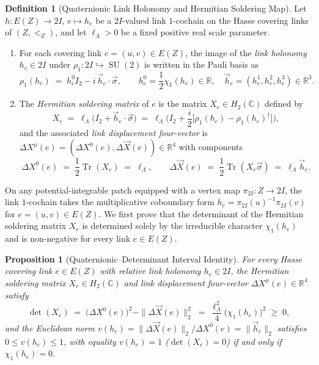 \documentclass[11pt,a4paper]{article}
\newtheorem{proposition}[theorem]{Proposition}
\theoremstyle{definition}
\newtheorem{definition}[theorem]{Definition}
\theoremstyle{remark}
\newcommand{\R}{\mathbb{R}}
\newcommand{\C}{\mathbb{C}}
\newcommand{\Tr}{\operatorname{Tr}}
\newcommand{\SU}{\operatorname{SU}}
\begin{document}
\begin{definition}[Quaternionic Link Holonomy and Hermitian Soldering Map]
\label{def:soldering_map}
Let $h : E(Z) \to 2I$, $e \mapsto h_e$ be a $2I$-valued link $1$-cochain on the Hasse covering links of $(Z, <_Z)$, and let $\ell_\Lambda > 0$ be a fixed positive real scale parameter.
\begin{enumerate}
    \item For each covering link $e = (u, v) \in E(Z)$, the image of the \emph{link holonomy} $h_e \in 2I$ under $\rho_1 : 2I \hookrightarrow \SU(2)$ is written in the Pauli basis as
    \begin{equation}
    \label{eq:pauli_decomp}
    \rho_1(h_e) \;=\; h_e^0 I_2 - i\,\vec{h}_e \cdot \vec{\sigma}, \qquad h_e^0 = \frac{1}{2}\chi_1(h_e) \in \R, \quad \vec{h}_e = (h_e^1, h_e^2, h_e^3) \in \R^3.
    \end{equation}
    \item The \emph{Hermitian soldering matrix} of $e$ is the matrix $X_e \in H_2(\C)$ defined by
    \begin{equation}
    \label{eq:hermitian_soldering_matrix}
    X_e \;=\; \ell_\Lambda\bigl(I_2 + \vec{h}_e \cdot \vec{\sigma}\bigr) \;=\; \ell_\Lambda\bigl(I_2 + \frac{i}{2}\bigl[\rho_1(h_e) - \rho_1(h_e)^\dagger\bigr]\bigr),
    \end{equation}
    and the associated \emph{link displacement four-vector} is $\Delta X^\mu(e) = (\Delta X^0(e), \Delta \vec{X}(e)) \in \R^4$ with components
    \begin{equation}
    \label{eq:link_four_vector}
    \Delta X^0(e) \;=\; \frac{1}{2}\Tr(X_e) \;=\; \ell_\Lambda, \qquad \Delta \vec{X}(e) \;=\; \frac{1}{2}\Tr(X_e \vec{\sigma}) \;=\; \ell_\Lambda \vec{h}_e.
    \end{equation}
\end{enumerate}
\end{definition}

On any potential-integrable patch equipped with a vertex map $\pi_{2I} : Z \to 2I$, the link $1$-cochain takes the multiplicative coboundary form $h_e = \pi_{2I}(u)^{-1}\pi_{2I}(v)$ for $e = (u, v) \in E(Z)$. We first prove that the determinant of the Hermitian soldering matrix $X_e$ is determined solely by the irreducible character $\chi_1(h_e)$ and is non-negative for every link $e \in E(Z)$.

\begin{proposition}[Quaternionic--Determinant Interval Identity]
\label{prop:interval_identity}
For every Hasse covering link $e \in E(Z)$ with relative link holonomy $h_e \in 2I$, the Hermitian soldering matrix $X_e \in H_2(\C)$ and link displacement four-vector $\Delta X^\mu(e) \in \R^4$ satisfy
\begin{equation}
\label{eq:interval_identity}
\det(X_e) \;=\; \bigl(\Delta X^0(e)\bigr)^2 - \|\Delta \vec{X}(e)\|_2^2 \;=\; \frac{\ell_\Lambda^2}{4}\bigl(\chi_1(h_e)\bigr)^2 \;\ge\; 0,
\end{equation}
and the Euclidean norm $v(h_e) = \|\Delta \vec{X}(e)\|_2 / \Delta X^0(e) = \|\vec{h}_e\|_2$ satisfies $0 \le v(h_e) \le 1$, with equality $v(h_e) = 1$ ($\det(X_e) = 0$) if and only if $\chi_1(h_e) = 0$.
\end{proposition}
\end{document}
